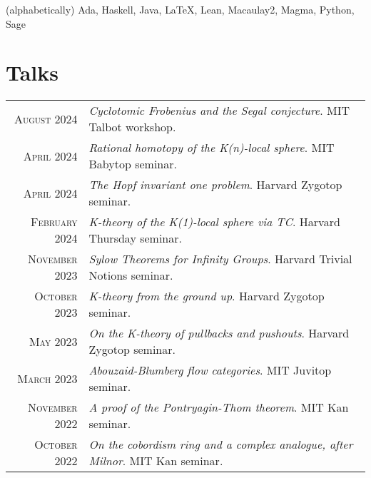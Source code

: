 \documentclass[a4paper,12pt]{article} %
\begin{document}
(alphabetically) Ada, Haskell, Java, {\fb \LaTeX}, Lean, Macaulay2, Magma, Python, Sage


\section{Talks}

\begin{tabular}{rl}

\textsc{August} 2024 & \emph{Cyclotomic Frobenius and the Segal conjecture}. MIT Talbot workshop.\\

\textsc{April} 2024 & \emph{Rational homotopy of the K(n)-local sphere}. MIT Babytop seminar.\\

\textsc{April} 2024 & \emph{The Hopf invariant one problem}. Harvard Zygotop seminar.\\

\textsc{February} 2024 & \emph{K-theory of the K(1)-local sphere via TC}. Harvard Thursday seminar.\\

\textsc{November} 2023 & \emph{Sylow Theorems for Infinity Groups}. Harvard Trivial Notions seminar.\\

\textsc{October} 2023 & \emph{K-theory from the ground up}. Harvard Zygotop seminar.\\

\textsc{May} 2023 & \emph{On the K-theory of pullbacks and pushouts}. Harvard Zygotop seminar.\\

\textsc{March} 2023 & \emph{Abouzaid-Blumberg flow categories}. MIT Juvitop seminar.\\

\textsc{November} 2022 & \emph{A proof of the Pontryagin-Thom theorem}. MIT Kan seminar.\\

\textsc{October} 2022 & \emph{On the cobordism ring and a complex analogue, after Milnor}. MIT Kan seminar.

\end{tabular}

\end{document}
